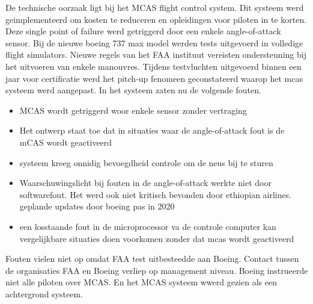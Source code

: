 \documentclass{article}
\begin{document}
	De technische oorzaak ligt bij het MCAS flight control system. Dit systeem werd geimplementeerd om kosten te reduceren en opleidingen voor piloten  in te korten.  Deze single point of failure \cite{uran05042019SPOF}
	werd getriggerd door een enkele angle-of-attack sensor\cite{boeing737maxdisplay}.
	Bij de  nieuwe boeing 737 max model werden tests uitgevoerd in volledige flight simulators. Nieuwe   regels van het FAA instituut vereisten ondersteuning bij het uitvoeren van enkele manouvres. Tijdens testvluchten uitgevoerd binnen een jaar voor certificatie werd het pitch-up fenomeen geconstateerd waarop het mcas systeem werd aangepast. 
	In het  systeem zaten nu de volgende fouten.
	
	\begin{itemize}
		\item MCAS wordt getriggerd woor enkele sensor zonder vertraging
		\item Het ontwerp staat toe dat  in situaties waar de angle-of-attack fout is de mCAS wordt geactiveerd
		\item systeem kreeg onnidig bevoegdheid controle om de neus bij te sturen
		\item  Waarschuwingslicht bij fouten in de angle-of-attack werkte niet door  softwarefout. Het werd ook niet kritisch bevonden door ethiopian airlines. geplande updates door boeing pas in 2020
		\item een losstaande fout in de microprocessor va de controle computer kan vergelijkbare situaties doen voorkomen zonder dat mcas wordt geactiveerd
	\end{itemize}
	Fouten vielen niet op omdat FAA test uitbesteedde aan Boeing. Contact tussen de organisaties FAA en Boeing verliep op management niveau. Boeing instrueerde niet alle piloten over MCAS. En het MCAS systeem wwerd gezien als een achtergrond  systeem.
	
\end{document}
